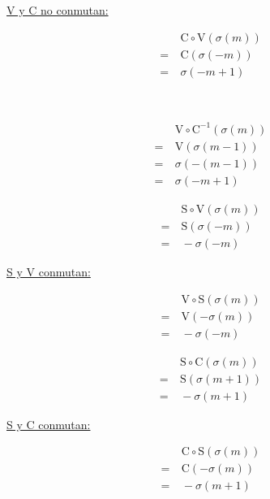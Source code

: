 \begin{center}
\begin{multicols}{3}
				\underline{V y C no conmutan:}
				
				\begin{align*}
				&\ \text{C}\circ\text{V}(\sigma(m))\\
				=&\ \text{C}(\sigma(-m))\\
				=&\ \sigma(-m+1)
				\end{align*}
				
				\ \linebreak
				
				\begin{align*}
				&\ \text{V}\circ\text{C}^{-1}(\sigma(m))\\
				=&\ \text{V}(\sigma(m-1))\\
				=&\ \sigma(-(m-1))\\
				=&\ \sigma(-m+1)
				\end{align*}
			\end{multicols}
			
			\begin{multicols}{3}
				\begin{align*}
				&\ \text{S}\circ\text{V}(\sigma(m))\\
				=&\ \text{S}(\sigma(-m))\\
				=&\ -\sigma(-m)
				\end{align*}
				
				\underline{S y V conmutan:}
				
				\begin{align*}
				&\ \text{V}\circ\text{S}(\sigma(m))\\
				=&\ \text{V}(-\sigma(m))\\
				=&\ -\sigma(-m)
				\end{align*}
			\end{multicols}
			
			\begin{multicols}{3}
				\begin{align*}
				&\ \text{S}\circ\text{C}(\sigma(m))\\
				=&\ \text{S}(\sigma(m+1))\\
				=&\ -\sigma(m+1)
				\end{align*}
				
				\underline{S y C conmutan:}
				
				\begin{align*}
				&\ \text{C}\circ\text{S}(\sigma(m))\\
				=&\ \text{C}(-\sigma(m))\\
				=&\ -\sigma(m+1)
				\end{align*}
			\end{multicols}
			

\end{center}

